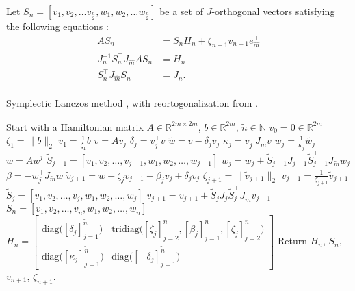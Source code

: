 \noindent Let $S_n = [v_1,v_2,\dots v_{\frac{n}{2}},w_1,w_2,\dots w_{\frac{n}{2}}]$ be a set of $J$-orthogonal vectors satisfying the following equations \cite{SLMprop}:
\begin{equation}
\begin{aligned}
AS_n &= S_n H_n + \zeta_{n+1} v_{n+1} e_{\hat{m}}^\top\\
J_{n}^{-1} S_n^\top J_{\hat{m}} A S_n &= H_n \\
S_n^{\top} J_{\hat{m}} S_n &= J_{n}.\\
\label{eqn:propS}
\end{aligned}
\end{equation}
\begin{algorithm} \caption{Symplectic Lanczos method \cite{SLM}, with reortogonalization from \cite{SLMO}. } \label{alg:symlanz}
\begin{algorithmic}
\STATE Start with a Hamiltonian matrix $A \in \mathbb{R}^{2\tilde{m} \times 2 \tilde{m}}$, $b \in \mathbb{R}^{2 \tilde{m}}$, $\tilde{n} \in \mathbb{N}$
\STATE $v_0= 0 \in \mathbb{R}^{2 \tilde{m}}$
\STATE $\zeta_1 = \| b\|_2$
\STATE $v_1= \frac{1}{\zeta_1}  b$
	\STATE $v = A v_j$
	\STATE $\delta_j =  v_j^\top v$
	\STATE $\tilde{w} = v-\delta_j v_j$
	\STATE $\kappa_j = v_j^\top J_{\tilde{m}} v $
	\STATE $w_j = \frac{1}{\kappa_j} \tilde{w_j}$
	\STATE $w = A w^j$
	\STATE $ \tilde{S}_{j-1} = [v_1,v_2,\dots,v_{j-1},w_1,w_2,\dots,w_{j-1}] $
	\STATE $ w_j = w_j + \tilde{S}_{j-1}J_{j-1} \tilde{S}_{j-1}^\top J_{\tilde{m}} w_j $
	\STATE $\beta = -w_j^\top J_{\tilde{m}} w$
	\STATE $\tilde{v}_{j+1} = w - \zeta_j v_{j-1} - \beta_j v_j + \delta_j v_j$
	\STATE $ \zeta_{j+1} = \|\tilde{v}_{j+1} \|_2 $
	\STATE $ v_{j+1} = \frac{1}{\zeta_{j+1}} \tilde{v}_{j+1} $
	\STATE $ \tilde{S}_j = [v_1,v_2,\dots,v_{j},w_1,w_2,\dots,w_{j}] $
	\STATE $ v_{j+1} = v_{j+1} + \tilde{S}_j J_j \tilde{S}_j^\top J_{\tilde{m}} v_{j+1} $
\ENDFOR
\STATE $S_n = [v_1,v_2,\dots,v_{\tilde{n}},w_1,w_2,\dots,w_{\tilde{n}}]$
\STATE $H_n = \begin{bmatrix}
\text{diag} \big( [\delta_j]^{\tilde{n}}_{j=1} \big) & \text{tridiag}\big( [\zeta_j]_{j=2}^{\tilde{n}},[\beta_j]_{j=1}^{\tilde{n}},[\zeta_j]_{j=2}^{\tilde{n}} \big) \\
\text{diag} \big( [\kappa_j]^{\tilde{n}}_{j=1} \big) & \text{diag} \big( [-\delta_j]^{\tilde{n}}_{j=1} \big)
\end{bmatrix} $
\STATE Return $H_n$, $S_n$, $v_{n+1}$, $\zeta_{n+1}$.
\end{algorithmic}
\end{algorithm}


